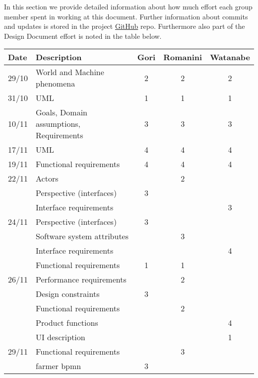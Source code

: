 In this section we provide detailed information about how much effort each group member spent in working at this document. Further information about commits and updates is stored in the project \href{https://github.com/MarcoRomanini/GoriRomaniniWatanabe}{GitHub} repo. Furthermore also part of the Design Document effort is noted in the table below. 



\begin{center}
    \setlength\arrayrulewidth{1pt}
    \begin{longtable}{llccc}
        
        \hline
        \rowcolor{myblue}\color{white}Date & \color{white}Description & \color{white}Gori & \color{white}Romanini & \color{white}Watanabe \\
        \hline
        29/10	&	World and Machine phenomena	&	2	&	2	&	2	\\
        \hline
        31/10	&	UML	&	1	&	1	&	1	\\
        \hline
        10/11	&	Goals, Domain assumptions, Requirements	&	3	&	3	&	3	\\
        \hline
        17/11	&	UML	&	4	&	4	&	4	\\
        \hline
        19/11	&	Functional requirements	&	4	&	4	&	4	\\
        \hline
        22/11	&	Actors	&		&	2	&		\\
        	&	Perspective (interfaces)	&	3	&		&		\\
        	&	Interface requirements	&		&		&	3	\\
        \hline
        24/11	&	Perspective (interfaces)	&	3	&		&		\\
        	&	Software system attributes	&		&	3	&		\\
        	&	Interface requirements	&		&		&	4	\\
        	&	Functional requirements	&	1	&	1	&		\\
        \hline
        26/11	&	Performance requirements	&		&	2	&		\\
        	&	Design constraints	&	3	&		&		\\
        	&	Functional requirements	&		&	2	&		\\
        	&	Product functions	&		&		&	4	\\
        	&	UI description	&		&		&	1	\\
        \hline
        29/11	&	Functional requirements	&		&	3	&		\\
        	&	farmer bpmn	&	3	&		&		\\

\end{longtable}
\end{center}
